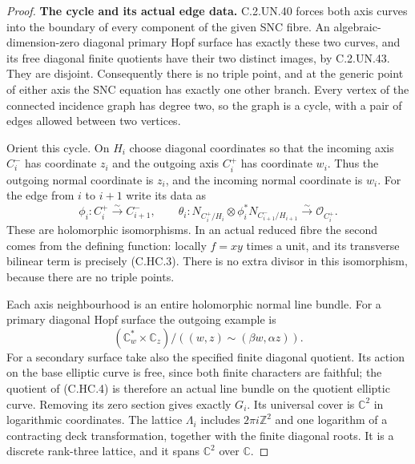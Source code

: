 \begin{proof}
\par\medskip\noindent\textbf{The cycle and its actual edge data.}
C.2.UN.40 forces both axis curves into the boundary of
every component of the given SNC fibre. An
algebraic-dimension-zero diagonal primary Hopf surface
has exactly these two curves, and its free diagonal
finite quotients have their two distinct images, by
C.2.UN.43. They are disjoint. Consequently there is
no triple point, and at the generic point of either
axis the SNC equation has exactly one other branch.
Every vertex of the connected incidence graph has
degree two, so the graph is a cycle, with a pair
of edges allowed between two vertices.

Orient this cycle. On $H_i$ choose diagonal coordinates
so that the incoming axis $C_i^-$ has coordinate $z_i$
and the outgoing axis $C_i^+$ has coordinate $w_i$.
Thus the outgoing normal coordinate is $z_i$, and
the incoming normal coordinate is $w_i$.
For the edge from $i$ to $i+1$ write its data as
\[
 \phi_i:C_i^+\xrightarrow{\sim}C_{i+1}^-,
 \qquad
 \theta_i:N_{C_i^+/H_i}\otimes
       \phi_i^*N_{C_{i+1}^-/H_{i+1}}
           \xrightarrow{\sim}\mathcal O_{C_i^+}.
\tag{C.HC.3}
\]
These are holomorphic isomorphisms. In an actual
reduced fibre the second comes from the defining
function: locally $f=xy$ times a unit, and its
transverse bilinear term is precisely (C.HC.3).
There is no extra divisor in this isomorphism,
because there are no triple points.

Each axis neighbourhood is an entire holomorphic
normal line bundle. For a primary diagonal Hopf
surface the outgoing example is
\[
 (\mathbb C^*_{w}\times\mathbb C_z)/
       ((w,z)\sim(\beta w,\alpha z)).
\tag{C.HC.4}
\]
For a secondary surface take also the specified
finite diagonal quotient. Its action on the base
elliptic curve is free, since both finite characters
are faithful; the quotient of (C.HC.4) is therefore
an actual line bundle on the quotient elliptic curve.
Removing its zero section gives exactly $G_i$.
Its universal cover is $\mathbb C^2$ in logarithmic
coordinates. The lattice $\Lambda_i$ includes
$2\pi i\mathbb Z^2$ and one logarithm of a contracting
deck transformation, together with the finite
diagonal roots. It is a discrete rank-three lattice,
and it spans $\mathbb C^2$ over $\mathbb C$.


\end{proof}
